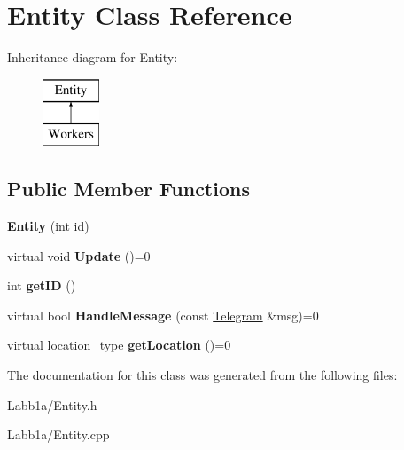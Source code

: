 \hypertarget{class_entity}{}\section{Entity Class Reference}
\label{class_entity}
Inheritance diagram for Entity\+:\begin{figure}[H]
\begin{center}
\leavevmode
\includegraphics[height=2.000000cm]{class_entity}
\end{center}
\end{figure}
\subsection*{Public Member Functions}
\begin{DoxyCompactItemize}
\item 
\hypertarget{class_entity_ac98bd610e0299cc2aa0538fb2884ab69}{}{\bfseries Entity} (int id)\label{class_entity_ac98bd610e0299cc2aa0538fb2884ab69}

\item 
\hypertarget{class_entity_aa9ee05393626060907a710597103ad43}{}virtual void {\bfseries Update} ()=0\label{class_entity_aa9ee05393626060907a710597103ad43}

\item 
\hypertarget{class_entity_a3c60d3c0561843490e93bde1f4566900}{}int {\bfseries get\+I\+D} ()\label{class_entity_a3c60d3c0561843490e93bde1f4566900}

\item 
\hypertarget{class_entity_acfbd9622ebb9948cf4bc3700b04ab75a}{}virtual bool {\bfseries Handle\+Message} (const \hyperlink{struct_telegram}{Telegram} \&msg)=0\label{class_entity_acfbd9622ebb9948cf4bc3700b04ab75a}

\item 
\hypertarget{class_entity_ab27dd18ecddf029d24c73ef076409f42}{}virtual location\+\_\+type {\bfseries get\+Location} ()=0\label{class_entity_ab27dd18ecddf029d24c73ef076409f42}

\end{DoxyCompactItemize}


The documentation for this class was generated from the following files\+:\begin{DoxyCompactItemize}
\item 
Labb1a/Entity.\+h\item 
Labb1a/Entity.\+cpp\end{DoxyCompactItemize}
